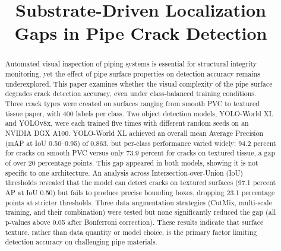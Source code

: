 \documentclass[conference]{IEEEtran}
\begin{document}
\title{Substrate-Driven Localization Gaps in Pipe Crack Detection}

\author{
}

\maketitle

\begin{abstract}
Automated visual inspection of piping systems is essential for structural integrity monitoring, yet the effect of pipe surface properties on detection accuracy remains underexplored. This paper examines whether the visual complexity of the pipe surface degrades crack detection accuracy, even under class-balanced training conditions. Three crack types were created on surfaces ranging from smooth PVC to textured tissue paper, with 400 labels per class. Two object detection models, YOLO-World XL and YOLOv8x, were each trained five times with different random seeds on an NVIDIA DGX A100. YOLO-World XL achieved an overall mean Average Precision (mAP at IoU 0.50--0.95) of 0.863, but per-class performance varied widely: 94.2 percent for cracks on smooth PVC versus only 73.9 percent for cracks on textured tissue, a gap of over 20 percentage points. This gap appeared in both models, showing it is not specific to one architecture. An analysis across Intersection-over-Union (IoU) thresholds revealed that the model can detect cracks on textured surfaces (97.1 percent AP at IoU 0.50) but fails to produce precise bounding boxes, dropping 23.1 percentage points at stricter thresholds. Three data augmentation strategies (CutMix, multi-scale training, and their combination) were tested but none significantly reduced the gap (all p-values above 0.05 after Bonferroni correction). These results indicate that surface texture, rather than data quantity or model choice, is the primary factor limiting detection accuracy on challenging pipe materials.
\end{abstract}
\end{document}
